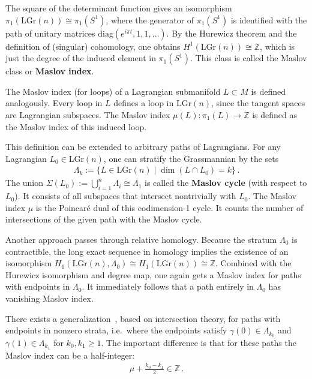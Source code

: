     \begin{property}
        The square of the determinant function gives an isomorphism $\pi_1(\mathrm{LGr}(n))\cong\pi_1(S^1)$, where the generator of $\pi_1(S^1)$ is identified with the path of unitary matrices $\mathrm{diag}(e^{i\pi t},1,1,\ldots)$. By the Hurewicz theorem and the definition of (singular) cohomology, one obtains $H^1(\mathrm{LGr}(n))\cong\mathbb{Z}$, which is just the degree of the induced element in $\pi_1(S^1)$. This class is called the Maslov class or \textbf{Maslov index}.

        The Maslov index (for loops) of a Lagrangian submanifold $L\subset M$ is defined analogously. Every loop in $L$ defines a loop in $\mathrm{LGr}(n)$, since the tangent spaces are Lagrangian subspaces. The Maslov index $\mu(L):\pi_1(L)\rightarrow\mathbb{Z}$ is defined as the Maslov index of this induced loop.

        This definition can be extended to arbitrary paths of Lagrangians. For any Lagrangian $L_0\in\mathrm{LGr}(n)$, one can stratify the Grassmannian by the sets
        \begin{gather}
            \Lambda_k := \{L\in\mathrm{LGr}(n)\mid\dim(L\cap L_0) = k\}\,.
        \end{gather}
        The union $\Sigma(L_0):=\bigcup_{i=1}^n\Lambda_i\cong\overline{\Lambda_1}$ is called the \textbf{Maslov cycle} (with respect to $L_0$). It consists of all subspaces that intersect nontrivially with $L_0$. The Maslov index $\mu$ is the Poincar\'e dual of this codimension-1 cycle. It counts the number of intersections of the given path with the Maslov cycle.

        Another approach passes through relative homology. Because the stratum $\Lambda_0$ is contractible, the long exact sequence in homology implies the existence of an isomorphism $H_1(\mathrm{LGr}(n),\Lambda_0)\cong H_1(\mathrm{LGr}(n))\cong\mathbb{Z}$. Combined with the Hurewicz isomorphism and degree map, one again gets a Maslov index for paths with endpoints in $\Lambda_0$. It immediately follows that a path entirely in $\Lambda_0$ has vanishing Maslov index.
    \end{property}
    \begin{remark}
        There exists a generalization~\citep{robbin_maslov_1993}, based on intersection theory, for paths with endpoints in nonzero strata, i.e.~where the endpoints satisfy $\gamma(0)\in\Lambda_{k_0}$ and $\gamma(1)\in\Lambda_{k_1}$ for $k_0,k_1\geq1$. The important difference is that for these paths the Maslov index can be a half-integer:
        \begin{gather}
            \mu + \frac{k_0-k_1}{2}\in\mathbb{Z}\,.
        \end{gather}
    \end{remark}

